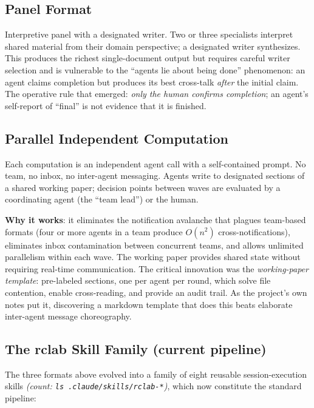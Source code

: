 \documentclass[12pt,a4paper]{article}
\newcommand{\countnote}[1]{{\small\textit{(count: #1)}}}
\begin{document}
\subsection{Panel Format}

Interpretive panel with a designated writer. Two or three specialists interpret shared material from their domain perspective; a designated writer synthesizes. This produces the richest single-document output but requires careful writer selection and is vulnerable to the ``agents lie about being done'' phenomenon: an agent claims completion but produces its best cross-talk \emph{after} the initial claim. The operative rule that emerged: \emph{only the human confirms completion}; an agent's self-report of ``final'' is not evidence that it is finished.

\subsection{Parallel Independent Computation}

Each computation is an independent agent call with a self-contained prompt. No team, no inbox, no inter-agent messaging. Agents write to designated sections of a shared working paper; decision points between waves are evaluated by a coordinating agent (the ``team lead'') or the human.

\textbf{Why it works}: it eliminates the notification avalanche that plagues team-based formats (four or more agents in a team produce $O(n^2)$ cross-notifications), eliminates inbox contamination between concurrent teams, and allows unlimited parallelism within each wave. The working paper provides shared state without requiring real-time communication. The critical innovation was the \emph{working-paper template}: pre-labeled sections, one per agent per round, which solve file contention, enable cross-reading, and provide an audit trail. As the project's own notes put it, discovering a markdown template that does this beats elaborate inter-agent message choreography.

\subsection{The rclab Skill Family (current pipeline)}
\label{sec:rclab}

The three formats above evolved into a family of eight reusable session-execution skills \countnote{\texttt{ls .claude/skills/rclab-*}}, which now constitute the standard pipeline:
\end{document}
